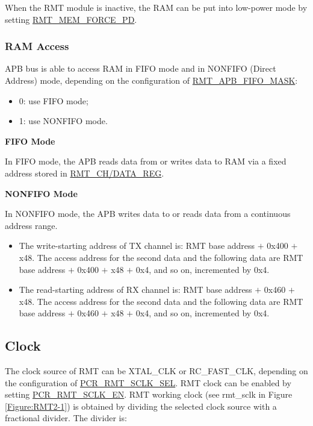 \documentclass[main\_\_EN.tex]{subfiles}
\begin{document}
When the RMT module is inactive, the RAM can be put into low-power mode by setting  \hyperref[fielddesc:RMTMEMFORCEPD]{RMT\_MEM\_FORCE\_PD}.

\subsubsection{RAM Access}
APB bus is able to access RAM in FIFO mode and in NONFIFO (Direct Address) mode, depending on the configuration of \hyperref[fielddesc:RMTAPBFIFOMASK]{RMT\_APB\_FIFO\_MASK}:
\begin{itemize}
    \item 0: use FIFO mode;
    \item 1: use NONFIFO mode.
\end{itemize}

\textbf{FIFO Mode}

In FIFO mode, the APB reads data from or writes data to RAM via a fixed address stored in \hyperref[regdesc:RMTCHNDATAREG]{RMT\_CH/DATA\_REG}.

\textbf{NONFIFO Mode}

In NONFIFO mode, the APB writes data to or reads data from a continuous address range.
\begin{itemize}
    \item The write-starting address of TX channel  is: RMT base address $+$ 0x400 $+$ x48. The access address for the second data and the following data are RMT base address $+$ 0x400 $+$ x48 $+$ 0x4, and so on, incremented by 0x4. 
    \item The read-starting address of RX channel  is: RMT base address $+$ 0x460 $+$ x48. The access address for the second data and the following data are RMT base address $+$ 0x460 $+$ x48 $+$ 0x4, and so on, incremented by 0x4. 
\end{itemize}



\subsection{Clock}\label{clock}
The clock source of RMT can be XTAL\_CLK or RC\_FAST\_CLK, depending on the configuration of \hyperref[fielddesc:PCRRMTSCLKSEL]{PCR\_RMT\_SCLK\_SEL}. RMT clock can be enabled by setting \hyperref[fielddesc:PCRRMTSCLKEN]{PCR\_RMT\_SCLK\_EN}. RMT working clock (see rmt\_sclk in Figure \ref{Figure:RMT2-1}) is obtained by dividing the selected clock source with a fractional divider. The divider is: 
\end{document}
